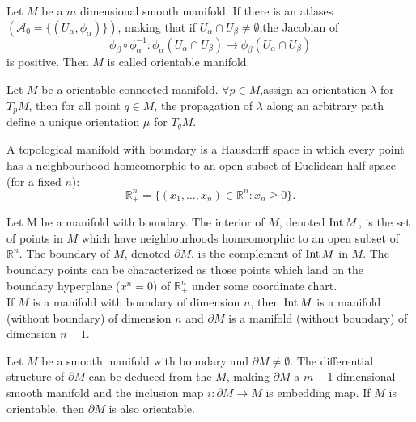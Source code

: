 \begin{newdef}
 Let $M$ be a $m$ dimensional smooth manifold. If there is an atlases $(\mathcal{A_0} = \{(U_{\alpha},\phi_{\alpha})\})$, making that if $U_{\alpha} \cap U_{\beta} \neq \emptyset$,the Jacobian of
\[\phi_{\beta} \circ \phi_{\alpha}^{-1} : \phi_{\alpha}(U_{\alpha} \cap U_{\beta}) \to \phi_{\beta}(U_{\alpha} \cap U_{\beta})\]
is positive. Then $M$ is called orientable manifold.
\end{newdef}

\begin{newthem}
Let $M$ be a orientable connected manifold. $\forall p \in M$,assign an orientation $\lambda$ for $T_pM$, then for all point $q \in M$, the propagation of $\lambda$ along an arbitrary path define a unique orientation $\mu$ for $T_q M$.
\end{newthem}

\begin{newdef}
A topological manifold with boundary is a Hausdorff space in which every point has a neighbourhood homeomorphic to an open subset of Euclidean half-space (for a fixed $n$):
\[\mathbb {R} _{+}^{n}=\{(x_{1},\ldots ,x_{n})\in \mathbb {R} ^{n}:x_{n}\geq 0\}.\]
\end{newdef}


\begin{newdef}
Let M be a manifold with boundary. The interior of $M$, denoted ${\rm Int} \, M$, is the set of points in $M$ which have neighbourhoods homeomorphic to an open subset of $\mathbb {R} ^{n}$. The boundary of $M$, denoted $\partial M$, is the complement of ${\rm Int} \, M$ in $M$. The boundary points can be characterized as those points which land on the boundary hyperplane ($x^n=0$) of $ \mathbb {R} _{+}^{n}$ under some coordinate chart.\\
If $M$ is a manifold with boundary of dimension $n$, then ${\rm Int} \, M$ is a manifold (without boundary) of dimension $n$ and $\partial M$ is a manifold (without boundary) of dimension $n-1$.
\end{newdef}

\begin{newthem}
Let $M$ be a smooth manifold with boundary and $\partial M \neq \emptyset$. The differential structure of $\partial M$ can be deduced from the $M$, making $\partial M$ a $m-1$ dimensional smooth manifold and the inclusion map $i:\partial M \to M$ is embedding map. If $M$ is orientable, then $\partial M$ is also orientable.
\end{newthem}

